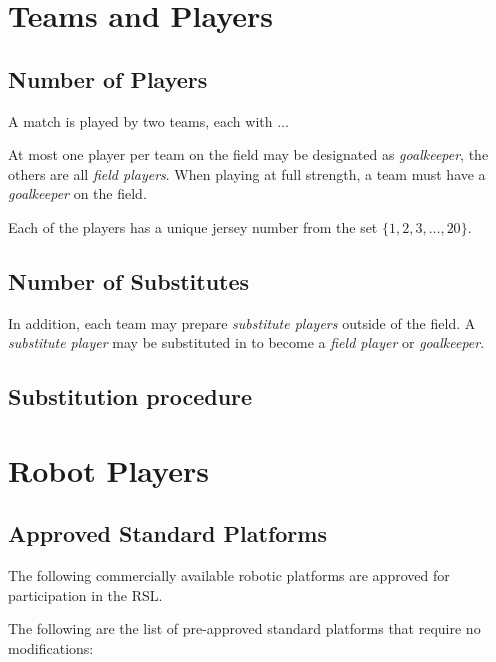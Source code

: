 \section{Teams and Players}
\label{sec:teams_and_players}

\subsection{Number of Players}
\label{sec:number_of_players}
A match is played by two teams, each with ...

At most one player per team on the field may be designated as \emph{goalkeeper}, the others are all \emph{field players}.
When playing at full strength, a team must have a \emph{goalkeeper} on the field.

Each of the players has a unique jersey number from the set $\{1, 2, 3, \ldots, 20\}$.
\subsection{Number of Substitutes}
\label{sec:number_of_substitutes}
In addition, each team may prepare \emph{substitute players} outside of the field.
A \emph{substitute player} may be substituted in to become a \emph{field player} or \emph{goalkeeper}.

\subsection{Substitution procedure}

\section{Robot Players}
\label{sec:robot_players}



\subsection{Approved Standard Platforms}
The following commercially available robotic platforms are approved for participation in the RSL. 

The following are the list of pre-approved standard platforms that require no modifications:

